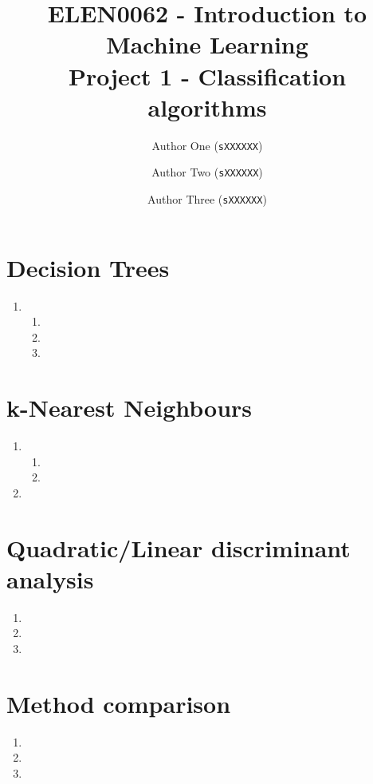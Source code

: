 \documentclass[acmconf,nonacm=true]{acmart}
\begin{document}
\title{ELEN0062 - Introduction to Machine Learning \\ 
Project 1 - Classification algorithms}

\author{Author One (\texttt{sXXXXXX})}
\author{Author Two (\texttt{sXXXXXX})}
\author{Author Three (\texttt{sXXXXXX})}

\maketitle

\section{Decision Trees}

\begin{enumerate}[label=(1.\arabic*)]
    \item \begin{enumerate}
        \item 
        \item 
        \item 
    \end{enumerate}
\end{enumerate}

\section{k-Nearest Neighbours}

\begin{enumerate}[label=(2.\arabic*)]
    \item \begin{enumerate}
        \item 
        \item 
    \end{enumerate}
    \item 
\end{enumerate}

\section{Quadratic/Linear discriminant analysis}

\begin{enumerate}[label=(2.\arabic*)]
    \item
    \item 
    \item 
\end{enumerate}

\section{Method comparison}

\begin{enumerate}[label=(2.\arabic*)]
    \item
    \item 
    \item 
\end{enumerate}
\end{document}
